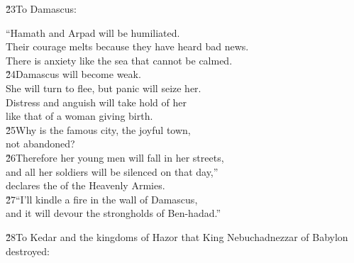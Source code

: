 \v{23}To Damascus:

\begin{poetry}
\poeml ``Hamath and Arpad will be humiliated. \\
\poemll    Their courage melts because they have heard bad news. \\
\poemlll       There is anxiety like the sea that cannot be calmed. \\
\poeml \v{24}Damascus will become weak. \\
\poemll    She will turn to flee, but panic will seize her. \\
\poeml Distress and anguish will take hold of her \\
\poemll    like that of a woman giving birth. \\
\poeml \v{25}Why is the famous city, the joyful town, \\
\poemll    not abandoned? \\
\poeml \v{26}Therefore her young men will fall in her streets, \\
\poemll    and all her soldiers will be silenced on that day,'' \\
\poemlll       declares the  of the Heavenly Armies. \\
\poeml \v{27}``I'll kindle a fire in the wall of Damascus, \\
\poemll    and it will devour the strongholds of Ben-hadad.''
\end{poetry}

\v{28}To Kedar and the kingdoms of Hazor that King Nebuchadnezzar of Babylon destroyed:

